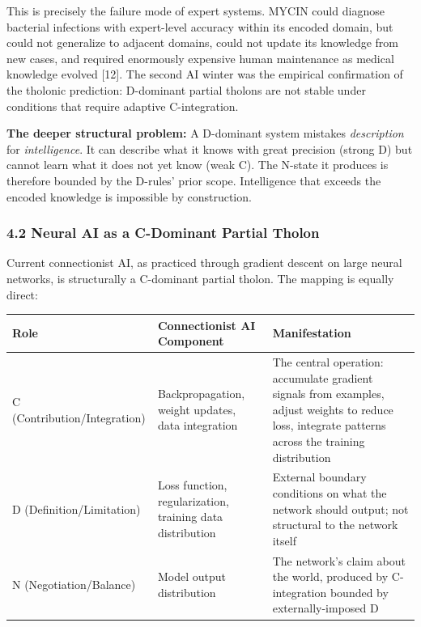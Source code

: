 \documentclass[
  11pt,
  letterpaper,
]{article}
\begin{document}
This is precisely the failure mode of expert systems. MYCIN could
diagnose bacterial infections with expert-level accuracy within its
encoded domain, but could not generalize to adjacent domains, could not
update its knowledge from new cases, and required enormously expensive
human maintenance as medical knowledge evolved {[}12{]}. The second AI
winter was the empirical confirmation of the tholonic prediction:
D-dominant partial tholons are not stable under conditions that require
adaptive C-integration.

\textbf{The deeper structural problem:} A D-dominant system mistakes
\emph{description} for \emph{intelligence}. It can describe what it
knows with great precision (strong D) but cannot learn what it does not
yet know (weak C). The N-state it produces is therefore bounded by the
D-rules' prior scope. Intelligence that exceeds the encoded knowledge is
impossible by construction.

\subsubsection{4.2 Neural AI as a C-Dominant Partial
Tholon}\label{neural-ai-as-a-c-dominant-partial-tholon}

Current connectionist AI, as practiced through gradient descent on large
neural networks, is structurally a C-dominant partial tholon. The
mapping is equally direct:

\begin{longtable}[]{@{}
  >{\raggedright\arraybackslash}p{}
  >{\raggedright\arraybackslash}p{}
  >{\raggedright\arraybackslash}p{}@{}}
\toprule\noalign{}
\begin{minipage}[b]{\linewidth}\raggedright
Role
\end{minipage} & \begin{minipage}[b]{\linewidth}\raggedright
Connectionist AI Component
\end{minipage} & \begin{minipage}[b]{\linewidth}\raggedright
Manifestation
\end{minipage} \\
\midrule\noalign{}
\endhead
\bottomrule\noalign{}
\endlastfoot
C (Contribution/Integration) & Backpropagation, weight updates, data
integration & The central operation: accumulate gradient signals from
examples, adjust weights to reduce loss, integrate patterns across the
training distribution \\
D (Definition/Limitation) & Loss function, regularization, training data
distribution & External boundary conditions on what the network should
output; not structural to the network itself \\
N (Negotiation/Balance) & Model output distribution & The network's
claim about the world, produced by C-integration bounded by
externally-imposed D \\
\end{longtable}
\end{document}

